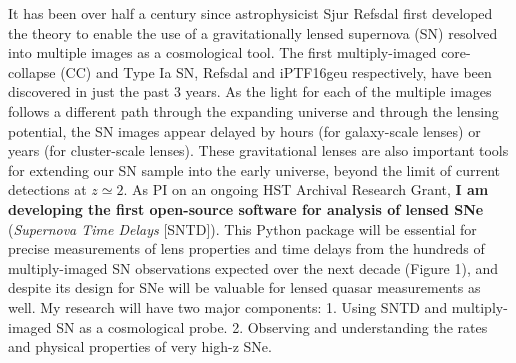 It has been over half a century since astrophysicist Sjur Refsdal
first developed the theory to enable the use of a gravitationally
lensed supernova (SN) resolved into multiple images as a cosmological
tool. The first multiply-imaged core-collapse (CC) and Type Ia SN,
Refsdal  and iPTF16geu 
respectively, have been discovered in just the past 3 years. As the
light for each of the multiple images follows a different path through
the expanding universe and through the lensing potential, the SN
images appear delayed by hours (for galaxy-scale lenses) or years (for
cluster-scale lenses). These gravitational lenses are also important
tools for extending our SN sample into the early universe, beyond the
limit of current detections at $z\simeq2$. As PI on an ongoing HST
Archival Research Grant, \textbf{I am developing the first open-source
software for analysis of lensed SNe} (\textit{Supernova Time Delays}
[SNTD]).  This Python package will be essential for precise
measurements of lens properties and time delays from the hundreds of
multiply-imaged SN observations expected over the next decade (Figure
1), and despite its design for SNe will be valuable for lensed quasar
measurements as well. My research will have two major components:
1. Using SNTD and multiply-imaged SN as a cosmological
probe. 2. Observing and understanding the rates and physical
properties of very high-z SNe.

